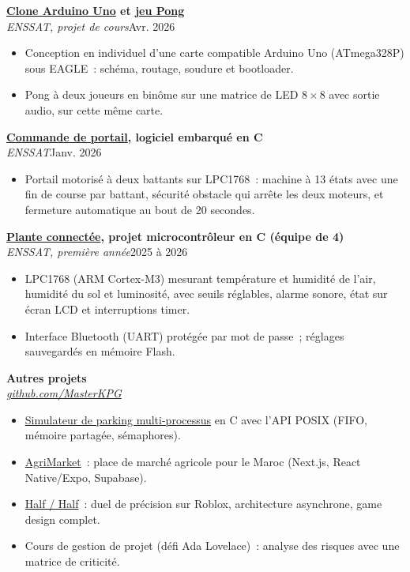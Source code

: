 \documentclass[10pt,a4paper]{article}
\newcommand{\entry}[3]{%
  \par\addvspace{6pt}%
  \noindent\textbf{#1}\\
  \textit{#2}\hfill #3\par
}
\newcommand{\project}[2]{\href{https://masterkpg.github.io/\#project-#1}{#2}}
\begin{document}
\entry{\project{arduino-clone}{Clone Arduino Uno} et \project{ping-pong}{jeu Pong}}{ENSSAT, projet de cours}{Avr. 2026}
\begin{itemize}
  \item Conception en individuel d'une carte compatible Arduino Uno (ATmega328P) sous EAGLE~:
        schéma, routage, soudure et bootloader.
  \item Pong à deux joueurs en binôme sur une matrice de LED $8\times8$ avec sortie audio, sur cette
        même carte.
\end{itemize}

\entry{\project{gate-controller}{Commande de portail}, logiciel embarqué en C}{ENSSAT}{Janv. 2026}
\begin{itemize}
  \item Portail motorisé à deux battants sur LPC1768~: machine à 13 états avec une fin de course par
        battant, sécurité obstacle qui arrête les deux moteurs, et fermeture automatique au bout de
        20 secondes.
\end{itemize}

\entry{\project{smart-garden}{Plante connectée}, projet microcontrôleur en C (équipe de 4)}{ENSSAT, première année}{2025 à 2026}
\begin{itemize}
  \item LPC1768 (ARM Cortex-M3) mesurant température et humidité de l'air, humidité du sol et
        luminosité, avec seuils réglables, alarme sonore, état sur écran LCD et interruptions timer.
  \item Interface Bluetooth (UART) protégée par mot de passe~; réglages sauvegardés en mémoire Flash.
\end{itemize}

\entry{Autres projets}{\href{https://github.com/MasterKPG}{github.com/MasterKPG}}{}
\begin{itemize}
  \item \project{parking-sim}{Simulateur de parking multi-processus} en C avec l'API POSIX (FIFO,
        mémoire partagée, sémaphores).
  \item \project{agrimarket}{AgriMarket}~: place de marché agricole pour le Maroc (Next.js, React
        Native/Expo, Supabase).
  \item \project{half-half}{Half / Half}~: duel de précision sur Roblox, architecture asynchrone,
        game design complet.
  \item Cours de gestion de projet (défi Ada Lovelace)~: analyse des risques avec une matrice de
        criticité.
\end{itemize}
\end{document}
